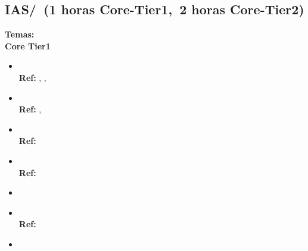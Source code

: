 \subsection{IAS/\IASPrinciplesofSecureDesign~(1 horas Core-Tier1,~2 horas Core-Tier2)}\label{sec:BOK:IASPrinciplesofSecureDesign}
\noindent \textbf{Temas:}\\
\noindent \textbf{Core Tier1}
\begin{itemize}
	\item \IASPrinciplesofSecureDesignTopicLeast\xspace \\ \textbf{Ref:} , , \label{sec:BOK:IASPrinciplesofSecureDesignTopicLeast}
	\item \IASPrinciplesofSecureDesignTopicFail\xspace \\ \textbf{Ref:} , \label{sec:BOK:IASPrinciplesofSecureDesignTopicFail}
	\item \IASPrinciplesofSecureDesignTopicOpen\xspace \\ \textbf{Ref:} \label{sec:BOK:IASPrinciplesofSecureDesignTopicOpen}
	\item \IASPrinciplesofSecureDesignTopicEnd\xspace \\ \textbf{Ref:} \label{sec:BOK:IASPrinciplesofSecureDesignTopicEnd}
	\item \IASPrinciplesofSecureDesignTopicDefense\label{sec:BOK:IASPrinciplesofSecureDesignTopicDefense}
	\item \IASPrinciplesofSecureDesignTopicSecurity\xspace \\ \textbf{Ref:} \label{sec:BOK:IASPrinciplesofSecureDesignTopicSecurity}
	\item \IASPrinciplesofSecureDesignTopicTensions\label{sec:BOK:IASPrinciplesofSecureDesignTopicTensions}
\end{itemize}

